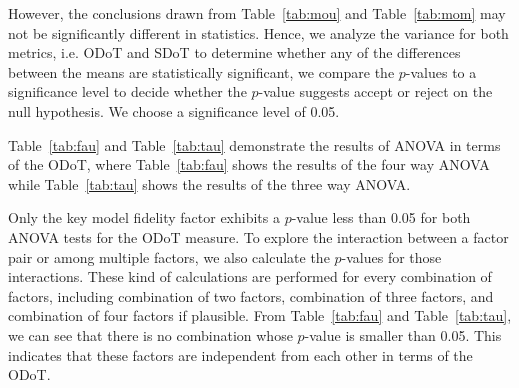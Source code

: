 However, the conclusions drawn from Table~\ref{tab:mou} and Table~\ref{tab:mom} may not be significantly different in statistics.
Hence, we analyze the variance for both metrics, i.e. ODoT and SDoT to determine whether any of the differences between the means are statistically significant, we compare the $p$-values to a significance level to decide whether the $p$-value suggests accept or reject on the null hypothesis. We choose a significance level of 0.05.

Table~\ref{tab:fau} and Table~\ref{tab:tau} demonstrate the results of ANOVA in terms of the ODoT, where Table~\ref{tab:fau} shows the results of the four way ANOVA while Table~\ref{tab:tau} shows the results of the three way ANOVA.

Only the key model fidelity factor exhibits a $p$-value less than 0.05 for both ANOVA tests for the ODoT measure.
To explore the interaction between a factor pair or among multiple factors, we also calculate the $p$-values for those interactions.
These kind of calculations are performed for every combination of factors, including combination of two factors, combination of three factors, and combination of four factors if plausible.
From Table~\ref{tab:fau} and Table~\ref{tab:tau}, we can see that there is no combination whose $p$-value is smaller than 0.05.
This indicates that these factors are independent from each other in terms of the ODoT.

